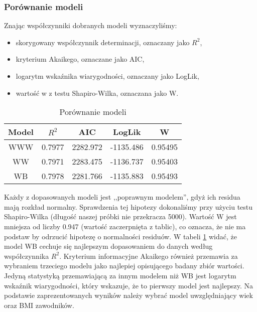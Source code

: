 \documentclass[11pt,a4paper]{article}
\begin{document}
\subsubsection{Porównanie modeli}
Znając współczynniki dobranych modeli wyznaczyliśmy:
\begin{itemize}
	\item skorygowany współczynnik determinacji, oznaczany jako $R^2$,
	\item kryterium Akaikego, oznaczane jako AIC,
	\item logarytm wskaźnika wiarygodności, oznaczany jako LogLik,
	\item wartość w z testu Shapiro-Wilka, oznaczana jako W.
\end{itemize}

\begin{table}[H]
	\begin{center}
	\begin{tabular}{| c | c | c | c | c |}
		\hline
		Model & $R^2$ & AIC & LogLik & W\\ \hline
		WWW & 0.7977 & 2282.972 & -1135.486 & 0.95495\\ \hline
		WW & 0.7971 & 2283.475 & -1136.737 & 0.95403\\ \hline 
		WB & 0.7978 & 2281.766 & -1135.883 & 0.95493\\ \hline  
	\end{tabular}
	\caption{Porównanie modeli}
	\label{porownanie_modeli_w}
\end{center}
\end{table}
Każdy z dopasowanych modeli jest ,,poprawnym modelem'', gdyż ich residua mają rozkład normalny. Sprawdzenia tej hipotezy dokonaliśmy przy użyciu testu Shapiro-Wilka (długość naszej próbki nie przekracza 5000). Wartość W jest mniejsza od liczby 0.947 (wartość zaczerpnięta z tablic), co oznacza, że nie ma podstaw by odrzucić hipotezę o normalności residuów. W tabeli \ref{porownanie_modeli_w} widać, że model WB cechuje się najlepszym dopasowaniem do danych według współczynnika $R^2$. Kryterium informacyjne Akaikego również przemawia za wybraniem trzeciego modelu jako najlepiej opisującego badany zbiór wartości. Jedyną statystyką przemawiającą za innym modelem niż WB jest logarytm wskaźnik wiarygodności, który wskazuje, że to pierwszy model jest najlepszy. Na podstawie zaprezentowanych wyników należy wybrać model uwzględniający wiek oraz BMI zawodników.
\end{document}
